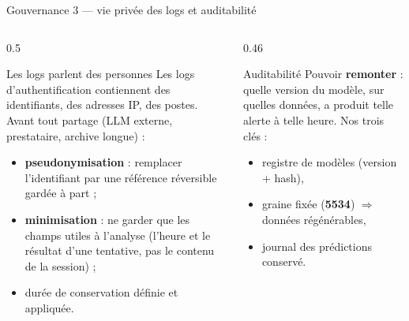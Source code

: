 \begin{frame}{Gouvernance 3 --- vie privée des logs et auditabilité}
\footnotesize%
\begin{columns}[t]
\begin{column}{0.5\textwidth}
\begin{block}{Les logs parlent des personnes}
Les logs d'authentification contiennent des identifiants, des adresses IP,
des postes. Avant tout partage (LLM externe, prestataire, archive longue) :
\begin{itemize}
\item \textbf{pseudonymisation} : remplacer l'identifiant par une référence
réversible gardée à part ;
\item \textbf{minimisation} : ne garder que les champs utiles à l'analyse
(l'heure et le résultat d'une tentative, pas le contenu de la session) ;
\item durée de conservation définie et appliquée.
\end{itemize}
\end{block}
\end{column}
\begin{column}{0.46\textwidth}
\begin{block}{Auditabilité}
Pouvoir \textbf{remonter} : quelle version du modèle, sur quelles données,
a produit telle alerte à telle heure. Nos trois clés :
\begin{itemize}
\item registre de modèles (version + hash),
\item graine fixée (\textbf{5534}) $\Rightarrow$ données régénérables,
\item journal des prédictions conservé.
\end{itemize}
\end{block}
\end{column}
\end{columns}
\end{frame}

